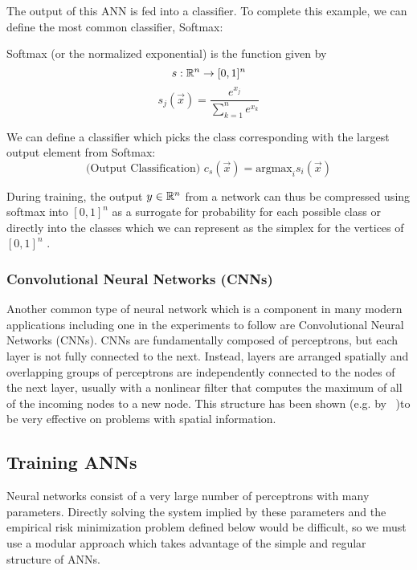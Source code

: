 

The output of this ANN is fed into a classifier. To complete this
example, we can define the most common classifier, Softmax:


\begin{definition}{Softmax (or the normalized exponential) is the function given by}
\[s : \mathbb{R}^n \to [0,1]^n\]
\[s_j(\vec x) = \frac{e^{x_j}}{\sum_{k = 1}^n e^{x_k}}\]
\end{definition}

\begin{definition}{We can define a classifier which picks the class corresponding with the largest output element from Softmax: }
\[\text{(Output Classification)  }   c_s(\vec x) = \text{argmax}_{i} s_i(\vec{x})\]
\end{definition}
During training, the output $y \in \mathbb{R}^n$ from a network can thus be
compressed using softmax into $[0,1]^n$ as a surrogate for probability
for each possible class or directly into the classes which we can
represent as the simplex for the vertices of $[0,1]^n$
\citep{Bishop:2006:PRM:1162264}. 

\subsubsection{Convolutional Neural Networks (CNNs)}\label{cnn}

Another common type of neural network which is a component in many modern applications including one in the experiments to follow are Convolutional Neural Networks (CNNs). CNNs are fundamentally composed of
perceptrons, but each layer is not fully connected to the
next. Instead, layers are arranged spatially and overlapping groups of
perceptrons are independently connected to the nodes of the next
layer, usually with a nonlinear filter that computes the maximum of
all of the incoming nodes to a new node. This structure has been shown
(e.g. by ~\citet{lecun1995convolutional})to be very effective on problems with spatial information. 

\subsection{Training ANNs}

Neural networks consist of a very large number of perceptrons with many parameters. Directly solving the system implied by these parameters and the empirical risk minimization problem defined below would be difficult, so we must use a
modular approach which takes advantage of the simple and regular structure of ANNs.

